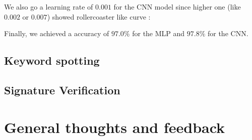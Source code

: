 \documentclass[a4paper,11pt]{report}
\begin{document}
We also go a learning rate of $0.001$ for the CNN model since higher one (like
$0.002$ or $0.007$) showed rollercoaster like curve :

\vspace*{0.2cm}

\begin{minipage}{0.49\textwidth}
  \begin{center}
  \end{center}
\end{minipage}
\begin{minipage}{0.49\textwidth}
Finally, we achieved a accuracy of $97.0\%$ for the MLP and $97.8\%$ for the CNN.
\end{minipage}

\subsection*{Keyword spotting}



\subsection*{Signature Verification}

\section*{General thoughts and feedback}
\end{document}
